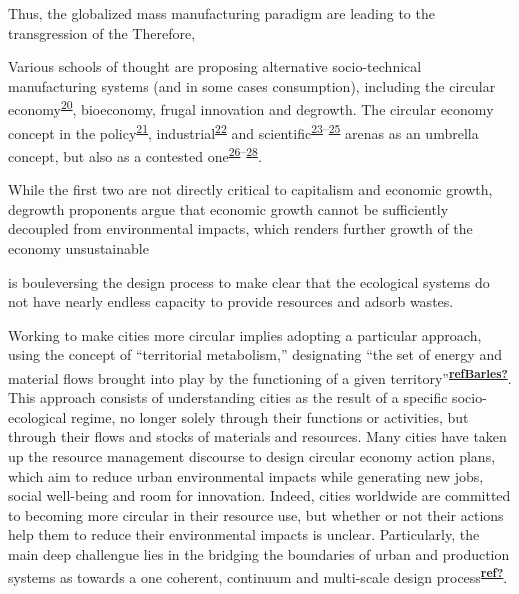 \documentclass[
  12pt,
  a4paperpaper,
  onecolumn]{article}
\begin{document}
Thus, the globalized mass manufacturing paradigm are leading to the
transgression of the Therefore,

Various schools of thought are proposing alternative socio-technical
manufacturing systems (and in some cases consumption), including the
circular
economy\textsuperscript{\protect\hyperlink{ref-Murray2017}{20}},
bioeconomy, frugal innovation and degrowth. The circular economy concept
in the policy\textsuperscript{\protect\hyperlink{ref-EC2015}{21}},
industrial\textsuperscript{\protect\hyperlink{ref-EllenMacArthurFoundation2015}{22}}
and
scientific\textsuperscript{\protect\hyperlink{ref-nobre2021}{23}--\protect\hyperlink{ref-Schoggl2020}{25}}
arenas as an umbrella concept, but also as a contested
one\textsuperscript{\protect\hyperlink{ref-CalistoFriant2020}{26}--\protect\hyperlink{ref-corvellec2021}{28}}.

While the first two are not directly critical to capitalism and economic
growth, degrowth proponents argue that economic growth cannot be
sufficiently decoupled from environmental impacts, which renders further
growth of the economy unsustainable

is bouleversing the design process to make clear that the ecological
systems do not have nearly endless capacity to provide resources and
adsorb wastes.

Working to make cities more circular implies adopting a particular
approach, using the concept of ``territorial metabolism,'' designating
``the set of energy and material flows brought into play by the
functioning of a given
territory''\textsuperscript{\protect\hyperlink{ref-refBarles}{\textbf{refBarles?}}}.\\
This approach consists of understanding cities as the result of a
specific socio-ecological regime, no longer solely through their
functions or activities, but through their flows and stocks of materials
and resources. Many cities have taken up the resource management
discourse to design circular economy action plans, which aim to reduce
urban environmental impacts while generating new jobs, social well-being
and room for innovation. Indeed, cities worldwide are committed to
becoming more circular in their resource use, but whether or not their
actions help them to reduce their environmental impacts is unclear.
Particularly, the main deep challengue lies in the bridging the
boundaries of urban and production systems as towards a one coherent,
continuum and multi-scale design
process\textsuperscript{\protect\hyperlink{ref-ref}{\textbf{ref?}}}.
\end{document}
